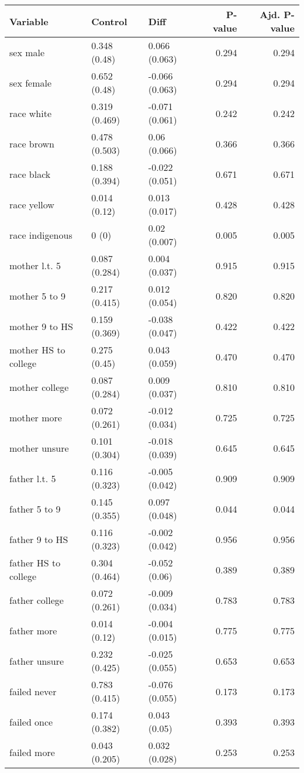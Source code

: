 \documentclass[
]{article}
\begin{document}
\begin{longtable}[t]{lllrr}
\toprule
Variable & Control & Diff & P-value & Ajd. P-value\\
\midrule\relax
sex male & 0.348 (0.48) & 0.066 (0.063) & 0.294 & 0.294\\
sex female & 0.652 (0.48) & -0.066 (0.063) & 0.294 & 0.294\\
race white & 0.319 (0.469) & -0.071 (0.061) & 0.242 & 0.242\\
race brown & 0.478 (0.503) & 0.06 (0.066) & 0.366 & 0.366\\
race black & 0.188 (0.394) & -0.022 (0.051) & 0.671 & 0.671\\
\addlinespace
race yellow & 0.014 (0.12) & 0.013 (0.017) & 0.428 & 0.428\\
race indigenous & 0 (0) & 0.02 (0.007) & 0.005 & 0.005\\
mother l.t. 5 & 0.087 (0.284) & 0.004 (0.037) & 0.915 & 0.915\\
mother 5 to 9 & 0.217 (0.415) & 0.012 (0.054) & 0.820 & 0.820\\
mother 9 to HS & 0.159 (0.369) & -0.038 (0.047) & 0.422 & 0.422\\
\addlinespace
mother HS to college & 0.275 (0.45) & 0.043 (0.059) & 0.470 & 0.470\\
mother college & 0.087 (0.284) & 0.009 (0.037) & 0.810 & 0.810\\
mother more & 0.072 (0.261) & -0.012 (0.034) & 0.725 & 0.725\\
mother unsure & 0.101 (0.304) & -0.018 (0.039) & 0.645 & 0.645\\
father l.t. 5 & 0.116 (0.323) & -0.005 (0.042) & 0.909 & 0.909\\
\addlinespace
father 5 to 9 & 0.145 (0.355) & 0.097 (0.048) & 0.044 & 0.044\\
father 9 to HS & 0.116 (0.323) & -0.002 (0.042) & 0.956 & 0.956\\
father HS to college & 0.304 (0.464) & -0.052 (0.06) & 0.389 & 0.389\\
father college & 0.072 (0.261) & -0.009 (0.034) & 0.783 & 0.783\\
father more & 0.014 (0.12) & -0.004 (0.015) & 0.775 & 0.775\\
\addlinespace
father unsure & 0.232 (0.425) & -0.025 (0.055) & 0.653 & 0.653\\
failed never & 0.783 (0.415) & -0.076 (0.055) & 0.173 & 0.173\\
failed once & 0.174 (0.382) & 0.043 (0.05) & 0.393 & 0.393\\
failed more & 0.043 (0.205) & 0.032 (0.028) & 0.253 & 0.253\\
\bottomrule
\end{longtable}
\end{document}
